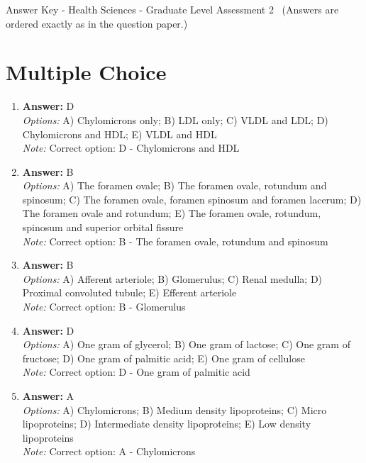 \documentclass[12pt]{article}
\begin{document}
\begin{center}
Answer Key - Health Sciences - Graduate Level Assessment 2 \
\small (Answers are ordered exactly as in the question paper.)
\end{center}

\section*{Multiple Choice}
\begin{enumerate}[label=\arabic*.]
\item \textbf{Answer:} D
\\ \textit{Options:} A) Chylomicrons only; B) LDL only; C) VLDL and LDL; D) Chylomicrons and HDL; E) VLDL and HDL
\\ \textit{Note:} Correct option: D - Chylomicrons and HDL
\item \textbf{Answer:} B
\\ \textit{Options:} A) The foramen ovale; B) The foramen ovale, rotundum and spinosum; C) The foramen ovale, foramen spinosum and foramen lacerum; D) The foramen ovale and rotundum; E) The foramen ovale, rotundum, spinosum and superior orbital fissure
\\ \textit{Note:} Correct option: B - The foramen ovale, rotundum and spinosum
\item \textbf{Answer:} B
\\ \textit{Options:} A) Afferent arteriole; B) Glomerulus; C) Renal medulla; D) Proximal convoluted tubule; E) Efferent arteriole
\\ \textit{Note:} Correct option: B - Glomerulus
\item \textbf{Answer:} D
\\ \textit{Options:} A) One gram of glycerol; B) One gram of lactose; C) One gram of fructose; D) One gram of palmitic acid; E) One gram of cellulose
\\ \textit{Note:} Correct option: D - One gram of palmitic acid
\item \textbf{Answer:} A
\\ \textit{Options:} A) Chylomicrons; B) Medium density lipoproteins; C) Micro lipoproteins; D) Intermediate density lipoproteins; E) Low density lipoproteins
\\ \textit{Note:} Correct option: A - Chylomicrons
\end{enumerate}
\end{document}
